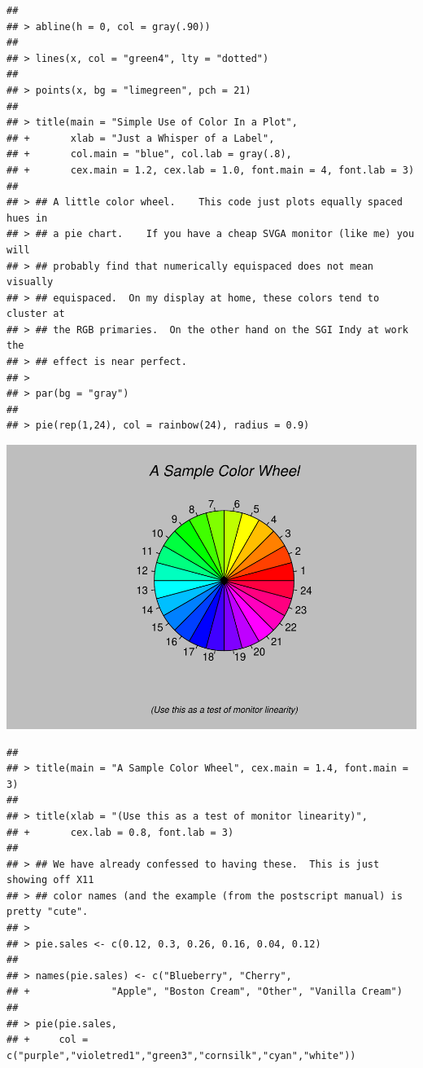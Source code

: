 \documentclass[
]{book}
\begin{document}
\begin{verbatim}
## 
## > abline(h = 0, col = gray(.90))
## 
## > lines(x, col = "green4", lty = "dotted")
## 
## > points(x, bg = "limegreen", pch = 21)
## 
## > title(main = "Simple Use of Color In a Plot",
## +       xlab = "Just a Whisper of a Label",
## +       col.main = "blue", col.lab = gray(.8),
## +       cex.main = 1.2, cex.lab = 1.0, font.main = 4, font.lab = 3)
## 
## > ## A little color wheel.    This code just plots equally spaced hues in
## > ## a pie chart.    If you have a cheap SVGA monitor (like me) you will
## > ## probably find that numerically equispaced does not mean visually
## > ## equispaced.  On my display at home, these colors tend to cluster at
## > ## the RGB primaries.  On the other hand on the SGI Indy at work the
## > ## effect is near perfect.
## > 
## > par(bg = "gray")
## 
## > pie(rep(1,24), col = rainbow(24), radius = 0.9)
\end{verbatim}

\includegraphics{TudodoR_files/figure-latex/unnamed-chunk-147-2.pdf}

\begin{verbatim}
## 
## > title(main = "A Sample Color Wheel", cex.main = 1.4, font.main = 3)
## 
## > title(xlab = "(Use this as a test of monitor linearity)",
## +       cex.lab = 0.8, font.lab = 3)
## 
## > ## We have already confessed to having these.  This is just showing off X11
## > ## color names (and the example (from the postscript manual) is pretty "cute".
## > 
## > pie.sales <- c(0.12, 0.3, 0.26, 0.16, 0.04, 0.12)
## 
## > names(pie.sales) <- c("Blueberry", "Cherry",
## +              "Apple", "Boston Cream", "Other", "Vanilla Cream")
## 
## > pie(pie.sales,
## +     col = c("purple","violetred1","green3","cornsilk","cyan","white"))
\end{verbatim}
\end{document}
